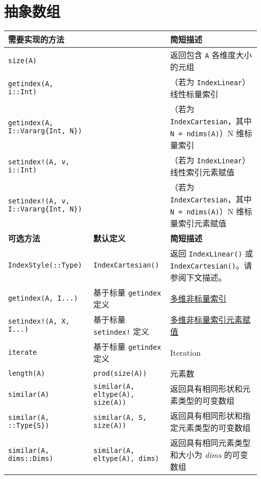 \hypertarget{522338241536202486}{}


\section{抽象数组}




\begin{table}[h]

\begin{tabulary}{\linewidth}{|L|L|L|}
\hline
需要实现的方法 &  & 简短描述 \\
\hline
\texttt{size(A)} &  & 返回包含 \texttt{A} 各维度大小的元组 \\
\hline
\texttt{getindex(A, i::Int)} &  & （若为 \texttt{IndexLinear}）线性标量索引 \\
\hline
\texttt{getindex(A, I::Vararg\{Int, N\})} &  & （若为 \texttt{IndexCartesian}，其中 \texttt{N = ndims(A)}）N 维标量索引 \\
\hline
\texttt{setindex!(A, v, i::Int)} &  & （若为 \texttt{IndexLinear}）线性索引元素赋值 \\
\hline
\texttt{setindex!(A, v, I::Vararg\{Int, N\})} &  & （若为 \texttt{IndexCartesian}，其中 \texttt{N = ndims(A)}）N 维标量索引元素赋值 \\
\hline
\textbf{可选方法} & \textbf{默认定义} & \textbf{简短描述} \\
\hline
\texttt{IndexStyle(::Type)} & \texttt{IndexCartesian()} & 返回 \texttt{IndexLinear()} 或 \texttt{IndexCartesian()}。请参阅下文描述。 \\
\hline
\texttt{getindex(A, I...)} & 基于标量 \texttt{getindex} 定义 & \hyperlink{16717190941363337071}{多维非标量索引} \\
\hline
\texttt{setindex!(A, X, I...)} & 基于标量 \texttt{setindex!} 定义 & \hyperlink{16717190941363337071}{多维非标量索引元素赋值} \\
\hline
\texttt{iterate} & 基于标量 \texttt{getindex} 定义 & Iteration \\
\hline
\texttt{length(A)} & \texttt{prod(size(A))} & 元素数 \\
\hline
\texttt{similar(A)} & \texttt{similar(A, eltype(A), size(A))} & 返回具有相同形状和元素类型的可变数组 \\
\hline
\texttt{similar(A, ::Type\{S\})} & \texttt{similar(A, S, size(A))} & 返回具有相同形状和指定元素类型的可变数组 \\
\hline
\texttt{similar(A, dims::Dims)} & \texttt{similar(A, eltype(A), dims)} & 返回具有相同元素类型和大小为 \emph{dims} 的可变数组 \\

\end{tabulary}
\end{table}

